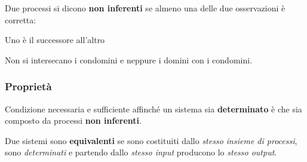 Due processi si dicono \textbf{non inferenti} se almeno una delle due osservazioni è corretta:
\begin{sitemize}
    \item Uno è il successore all'altro
    \item Non si intersecano i condomini e neppure i domini con i condomini.
\end{sitemize}

\subsubsection*{Proprietà}
\begin{sitemize}
    \item Condizione necessaria e sufficiente affinché un sistema sia \textbf{determinato} è che sia composto da processi \textbf{non inferenti}.
    \item Due sistemi sono \textbf{equivalenti} se sono costituiti dallo \textit{stesso insieme di processi}, sono \textit{determinati} e partendo dallo \textit{stesso input} producono lo \textit{stesso output}.
\end{sitemize}
